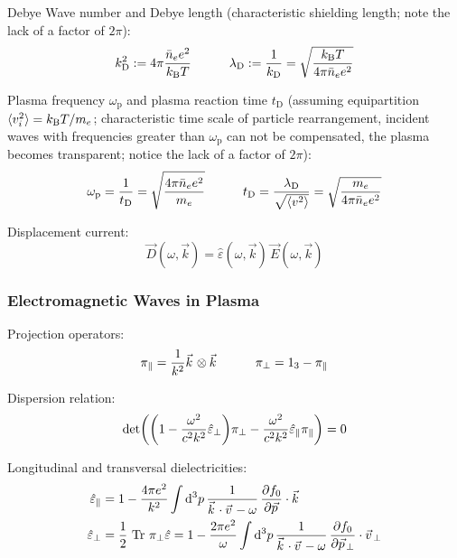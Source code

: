 			\noindent
			Debye Wave number and Debye length (characteristic shielding length; note the lack of a factor of $2\pi$):
			\begin{equation}
				k_\text{D}^2 := 4\pi \frac{\bar{n}_e e^2}{k_{\text{B}} T} \hspace{30pt}
				\lambda_\text{D} := \frac{1}{k_\text{D}} = \sqrt{\frac{k_{\text{B}} T}{4\pi \bar{n}_e e^2}}
			\end{equation}

			\noindent
			Plasma frequency $\omega_\text{p}$ and plasma reaction time $t_\text{D}$ (assuming equipartition $\langle v_i^2 \rangle = k_{\text{B}} T / m_e$; characteristic time scale of particle rearrangement, incident waves with frequencies greater than $\omega_\text{p}$ can not be compensated, the plasma becomes transparent; notice the lack of a factor of $2\pi$):
			\begin{equation}
				\omega_\text{p} = \frac{1}{t_\text{D}} = \sqrt{\frac{4\pi\bar{n}_e e^2}{m_e}} \hspace{30pt}
				t_\text{D} = \frac{\lambda_\text{D}}{\sqrt{\langle v^2 \rangle}} = \sqrt{\frac{m_e}{4\pi \bar{n}_e e^2}}
			\end{equation}

			\noindent
			Displacement current:
			\begin{equation}
				\vec{D}(\omega,\vec{k})  = \hat{\varepsilon}(\omega, \vec{k}) \, \vec{E}(\omega, \vec{k})
			\end{equation}

		\subsubsection{Electromagnetic Waves in Plasma}
			Projection operators:
			\begin{equation}
				\pi_\parallel = \frac{1}{k^2}\vec{k}\otimes\vec{k}
				\hsp
				\pi_\perp = 1_3 - \pi_\parallel
			\end{equation}

			\noindent
			Dispersion relation:
			\begin{equation}
				\det(\qty(1 - \frac{\omega^2}{c^2 k^2}\hat{\varepsilon}_\perp) \pi_\perp - \frac{\omega^2}{c^2 k^2}\hat{\varepsilon}_\parallel \pi_\parallel) = 0
			\end{equation}

			\noindent
			Longitudinal and transversal dielectricities:
			\begin{equation}
				\begin{aligned}
					\hat{\varepsilon}_{\parallel} &= 1-\frac{4\pi e^{2}}{k^{2}}\int{\mathrm d^{3}}p\,\frac{1}{\vec{k}\cdot\vec{v}-\omega}\,\frac{\partial f_{0}}{\partial\vec{p}}\cdot\vec{k}\\
					\hat{\varepsilon}_{\perp} &= \frac{1}{2}\,\tr\,\pi_{\perp}\hat{\varepsilon}=1-\frac{2\pi e^{2}}{\omega}\int\mathrm{d}^{3}p\,\frac{1}{\vec{k}\cdot\vec{v}-\omega}\,\frac{\partial f_{0}}{\partial\vec{p}_{\perp}}\cdot\vec{v}_{\perp}
				\end{aligned}
			\end{equation}


